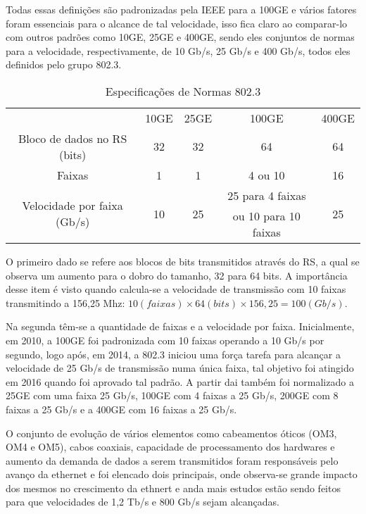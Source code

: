 \documentclass[a4paper,12pt]{article}
\begin{document}
Todas essas definições são padronizadas pela IEEE para a 100GE e vários fatores foram essenciais para o alcance de tal velocidade, isso fica claro ao comparar-lo com outros padrões como 10GE, 25GE e 400GE, sendo eles conjuntos de normas para a velocidade, respectivamente, de 10 Gb/s, 25 Gb/s e 400 Gb/s,  todos eles definidos pelo grupo 802.3.

\begin{center}
	\begin{table}[h!]
	\centering
		\begin{tabular}{ | c | c | c | c | c | }
			\hline
			& \multirow{2}{*}{10GE} & \multirow{2}{*}{25GE} & \multirow{2}{*}{100GE} & \multirow{2}{*}{400GE} \\
			& & & & \\
			\hline
			Bloco de dados no RS (bits) & 32 & 32 & 64 & 64 \\
			\hline
			Faixas & 1 & 1 & 4 ou 10 & 16 \\
			\hline
			\multirow{2}{*}{Velocidade por faixa (Gb/s)} & \multirow{2}{*}{10} & \multirow{2}{*}{25} &  25 para 4 faixas & \multirow{2}{*}{25} \\
			& & & ou 10 para 10 faixas & \\
			\hline
		\end{tabular}
		\centering
		\captionsetup{labelformat=empty} 
		\caption{Especificações de Normas 802.3}
	\end{table}
	
\end{center}

O primeiro dado se refere aos blocos de bits transmitidos através do RS, a qual se observa um aumento para o dobro do tamanho, 32 para 64 bits. A importância desse item é visto quando calcula-se a velocidade de transmissão com 10 faixas transmitindo a 156,25 Mhz:
$10(faixas) \times 64(bits) \times 156,25 = 100 (Gb/s)$.

Na segunda têm-se a quantidade de faixas e a velocidade por faixa. Inicialmente, em 2010, a 100GE foi padronizada com 10 faixas operando a 10 Gb/s por segundo, logo após, em 2014, a 802.3 iniciou uma força tarefa para alcançar a velocidade de 25 Gb/s de transmissão numa única faixa, tal objetivo foi atingido em 2016 quando foi aprovado tal padrão. A partir dai também foi normalizado a 25GE com uma faixa 25 Gb/s, 100GE com 4 faixas a 25 Gb/s, 200GE com 8 faixas a 25 Gb/s e a 400GE com 16 faixas a 25 Gb/s.

O conjunto de evolução de vários elementos como cabeamentos óticos (OM3, OM4 e OM5), cabos coaxiais, capacidade de processamento dos hardwares e aumento da demanda de dados a serem transmitidos foram responsáveis pelo avanço da ethernet e foi elencado dois principais, onde observa-se grande impacto dos mesmos no crescimento da ethnert e anda mais estudos estão sendo feitos para que velocidades de 1,2 Tb/s e 800 Gb/s sejam alcançadas.
\end{document}
